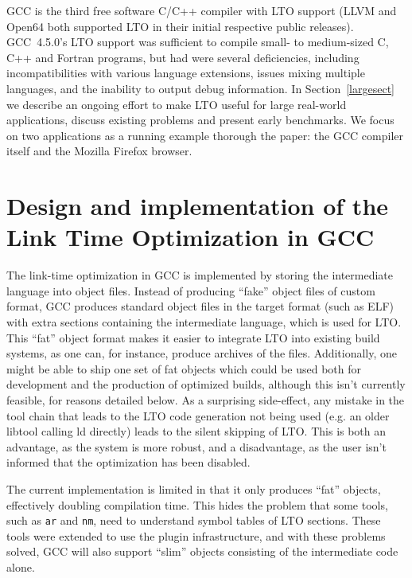 \documentclass[final]{ols}
\begin{document}
GCC is the third free software C/C++ compiler with LTO support (LLVM and Open64
both supported LTO in their initial respective public releases).  GCC~4.5.0's
LTO support was sufficient to compile small- to medium-sized C, C++ and Fortran
programs, but had were several deficiencies, including incompatibilities with
various language extensions, issues mixing multiple languages, and the
inability to output debug information.  In Section~\ref{largesect} we describe
an ongoing effort to make LTO useful for large real-world applications, discuss
existing problems and present early benchmarks.  We focus on two applications
as  a running example thorough the paper: the GCC compiler itself and the
Mozilla Firefox browser.


\section{Design and implementation of the Link Time Optimization in GCC}
\label{ltosect}
The link-time optimization in GCC is implemented by storing the intermediate
language into object files.  Instead of producing ``fake'' object files of
custom format, GCC produces standard object files in the target format (such as
ELF) with extra sections containing the intermediate language, which is used
for LTO.  This ``fat'' object format makes it easier to integrate LTO into
existing build systems, as one can, for instance, produce archives of the
files.  Additionally, one might be able to ship one set of fat objects which
could be used both for development and the production of optimized builds,
although this isn't currently feasible, for reasons detailed below.  As a
surprising side-effect, any mistake in the tool chain that leads to the LTO
code generation not being used (e.g. an older libtool calling ld directly)
leads to the silent skipping of LTO.  This is both an advantage, as the system
is more robust, and a disadvantage, as the user isn't informed that the
optimization has been disabled.

The current implementation is limited in that it only produces ``fat'' objects,
effectively doubling compilation time.  This hides the problem that some tools,
such as {\tt ar} and {\tt nm}, need to understand symbol tables of LTO sections.
These tools were extended to use the plugin infrastructure, and with these
problems solved, GCC will also support ``slim'' objects consisting of the
intermediate code alone.
\end{document}
